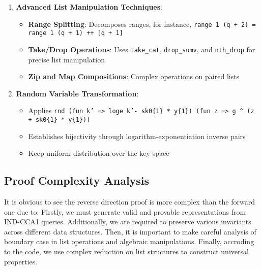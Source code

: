 \begin{enumerate}
\item \textbf{Advanced List Manipulation Techniques}:
   \begin{itemize}
   \item \textbf{Range Splitting}: Decomposes ranges, for instance, \texttt{range 1 (q + 2) = range 1 (q + 1) ++ [q + 1]}
   \item \textbf{Take/Drop Operations}: Uses \texttt{take\_cat}, \texttt{drop\_sumv}, and \texttt{nth\_drop} for precise list manipulation
   \item \textbf{Zip and Map Compositions}: Complex operations on paired lists
   \end{itemize}

\item \textbf{Random Variable Transformation}:
   \begin{itemize}
   \item Applies \texttt{rnd (fun k' => loge k'- sk0\{1\} * y\{1\}) (fun z => g \textasciicircum{} (z + sk0\{1\} * y\{1\}))}
   \item Establishes bijectivity through logarithm-exponentiation inverse pairs
   \item  Keep uniform distribution over the key space
   \end{itemize}
\end{enumerate}



\subsection{Proof Complexity Analysis}

It is obvious to see the reverse direction proof is more complex than the forward one due to:
Firstly, we must generate valid and provable representations from IND-CCA1 queries. Additionally, we are required to preserve various invariants across different data structures. Then, it is important to make careful analysis of boundary case in list operations and algebraic manipulations. Finally, accroding to the code, we use complex reduction on list structures to construct universal properties.






























